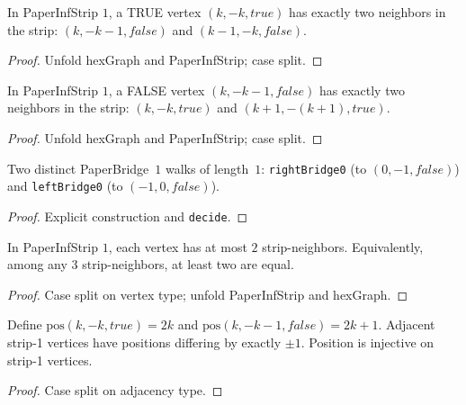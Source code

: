 \begin{lemma}
\begin{lemma}\label{lem:strip1_true_nbrs}
\leanok
{}
  In PaperInfStrip $1$, a TRUE vertex $(k, -k, \mathit{true})$ has exactly
  two neighbors in the strip: $(k, {-k-1}, \mathit{false})$ and
  $(k{-}1, -k, \mathit{false})$.
\end{lemma}
\begin{proof}\leanok Unfold hexGraph and PaperInfStrip; case split.\end{proof}

\begin{lemma}\label{lem:strip1_false_nbrs}
\leanok
{}
  In PaperInfStrip $1$, a FALSE vertex $(k, {-k-1}, \mathit{false})$ has exactly
  two neighbors in the strip: $(k, -k, \mathit{true})$ and
  $(k{+}1, {-(k+1)}, \mathit{true})$.
\end{lemma}
\begin{proof}\leanok Unfold hexGraph and PaperInfStrip; case split.\end{proof}

\begin{lemma}\label{lem:explicit_bridges}
\leanok
{}
  Two distinct PaperBridge~$1$ walks of length~$1$:
  \texttt{rightBridge0} (to $(0,-1,\mathit{false})$)
  and \texttt{leftBridge0} (to $(-1,0,\mathit{false})$).
\end{lemma}
\begin{proof}\leanok Explicit construction and \texttt{decide}.\end{proof}

\begin{lemma}\label{lem:strip1_path_graph}
\leanok
{}
  In PaperInfStrip $1$, each vertex has at most $2$ strip-neighbors.
  Equivalently, among any $3$ strip-neighbors, at least two are equal.
\end{lemma}
\begin{proof}\leanok Case split on vertex type; unfold PaperInfStrip and hexGraph.\end{proof}

\begin{lemma}\label{lem:strip1_pos}
\leanok
{}
  Define $\mathrm{pos}(k, -k, \mathit{true}) = 2k$ and
  $\mathrm{pos}(k, -k-1, \mathit{false}) = 2k+1$. Adjacent strip-1
  vertices have positions differing by exactly $\pm 1$. Position is
  injective on strip-1 vertices.
\end{lemma}
\begin{proof}\leanok Case split on adjacency type.\end{proof}


\end{lemma}

